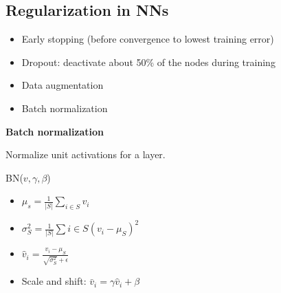 \subsection{Regularization in NNs}

\begin{itemize}
    \item Early stopping (before convergence to lowest training error)
    \item Dropout: deactivate about 50\% of the nodes during training
    \item Data augmentation
    \item Batch normalization
\end{itemize}

\textbf{Batch normalization}

Normalize unit activations for a layer.

BN($v,\gamma,\beta$)
\begin{itemize}
    \item $\mu_s = \frac{1}{|S|}\sum_{i\in S}v_i$
    \item $\sigma_S^2 = \frac{1}{|S|}\sum{i\in S}(v_i - \mu_S)^2$
    \item $\hat{v}_i = \frac{v_i - \mu_S}{\sqrt{\sigma_S^2} + \epsilon}$
    \item Scale and shift: $\bar{v}_i = \gamma\hat{v}_i + \beta$
\end{itemize}